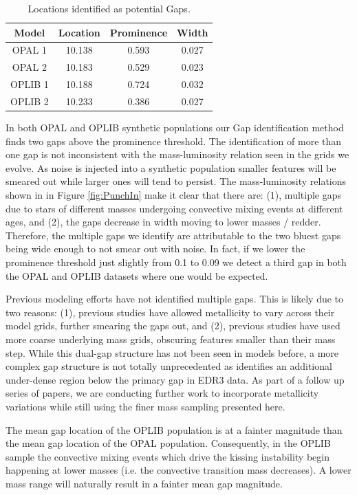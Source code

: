 \begin{table}
	\centering
	\begin{tabular}{c | c c c}
		\hline
		Model & Location & Prominence & Width\\
		\hline
		\hline
		OPAL 1 & 10.138 & 0.593 & 0.027 \\
		OPAL 2 & 10.183 & 0.529 & 0.023 \\
		OPLIB 1 & 10.188 & 0.724 & 0.032 \\
		OPLIB 2 & 10.233 & 0.386 & 0.027 
	\end{tabular}
	\caption{Locations identified as potential Gaps.}
	\label{tab:GapLocation}
\end{table}

In both OPAL and OPLIB synthetic populations our Gap identification method
finds two gaps above the prominence threshold. The identification of more than
one gap is not inconsistent with the mass-luminosity relation seen in the grids
we evolve. As noise is injected into a synthetic population smaller features will
be smeared out while larger ones will tend to persist. The mass-luminosity
relations shown in in Figure \ref{fig:PunchIn} make it clear that there are: (1),
multiple gaps due to stars of different masses undergoing convective mixing
events at different ages, and (2), the gaps decrease in width moving to lower
masses / redder. Therefore, the multiple gaps we identify are attributable to
the two bluest gaps being wide enough to not smear out with noise. In fact, if
we lower the prominence threshold just slightly from 0.1 to 0.09 we detect a
third gap in both the OPAL and OPLIB datasets where one would be expected.

Previous modeling efforts \citep[e.g.][]{Feiden2021} have not identified
multiple gaps. This is likely due to two reasons: (1), previous studies have
allowed metallicity to vary across their model grids, further smearing the gaps
out, and (2), previous studies have used more coarse underlying mass grids,
obscuring features smaller than their mass step. While this dual-gap structure
has not been seen in models before, a more complex gap structure is not totally
unprecedented as \citet{Jao2021} identifies an additional under-dense region
below the primary gap in EDR3 data. As part of a follow up series of papers, we
are conducting further work to incorporate metallicity variations while still
using the finer mass sampling presented here.


The mean gap location of the OPLIB population is at a fainter magnitude than
the mean gap location of the OPAL population. Consequently, in the OPLIB sample
the convective mixing events which drive the kissing instability begin
happening at lower masses (i.e. the convective transition mass decreases). A
lower mass range will naturally result in a fainter mean gap magnitude.

